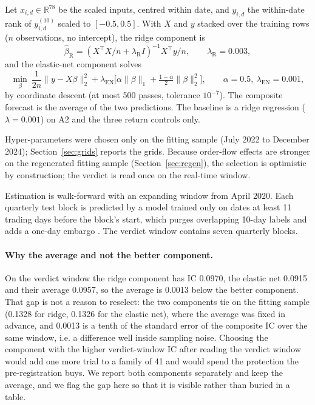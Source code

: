 Let $x_{i,d}\in\mathbb{R}^{78}$ be the scaled inputs, centred within date, and $y_{i,d}$ the within-date rank of $y^{(10)}_{i,d}$ scaled to $[-0.5,0.5]$. With $X$ and $y$ stacked over the training rows ($n$ observations, no intercept), the ridge component \citep{hoerl1970} is
\begin{equation}
\hat\beta_{\mathrm R}=\left(X^\top X/n+\lambda_{\mathrm R}I\right)^{-1}X^\top y/n,\qquad \lambda_{\mathrm R}=0.003,
\end{equation}
and the elastic-net component \citep{zou2005} solves
\begin{equation}
\min_\beta\ \frac{1}{2n}\|y-X\beta\|_2^2+\lambda_{\mathrm{EN}}\Big[\alpha\|\beta\|_1+\tfrac{1-\alpha}{2}\|\beta\|_2^2\Big],\qquad \alpha=0.5,\ \lambda_{\mathrm{EN}}=0.001,
\end{equation}
by coordinate descent \citep{friedman2010} (at most 500 passes, tolerance $10^{-7}$). The composite forecast is the average of the two predictions. The baseline is a ridge regression ($\lambda=0.001$) on A2 and the three return controls only.

Hyper-parameters were chosen only on the fitting sample (July 2022 to December 2024); Section~\ref{sec:grids} reports the grids. Because order-flow effects are stronger on the regenerated fitting sample (Section~\ref{sec:regen}), the selection is optimistic by construction; the verdict is read once on the real-time window.

Estimation is walk-forward with an expanding window from April 2020. Each quarterly test block is predicted by a model trained only on dates at least 11 trading days before the block's start, which purges overlapping 10-day labels and adds a one-day embargo \citep{lopezdeprado2018}. The verdict window contains seven quarterly blocks.

\paragraph{Why the average and not the better component.} On the verdict window the ridge component has IC 0.0970, the elastic net 0.0915 and their average 0.0957, so the average is 0.0013 below the better component. That gap is not a reason to reselect: the two components tie on the fitting sample (0.1328 for ridge, 0.1326 for the elastic net), where the average was fixed in advance, and 0.0013 is a tenth of the standard error of the composite IC over the same window, i.e. a difference well inside sampling noise. Choosing the component with the higher verdict-window IC after reading the verdict window would add one more trial to a family of 41 and would spend the protection the pre-registration buys. We report both components separately and keep the average, and we flag the gap here so that it is visible rather than buried in a table.

